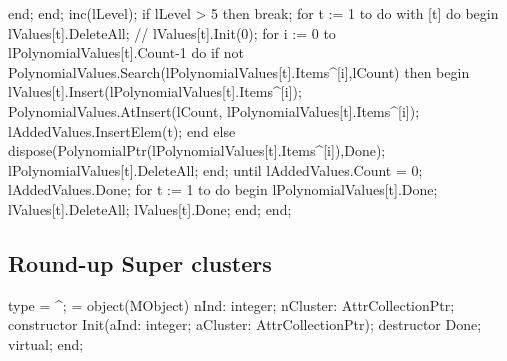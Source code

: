                   end;
      end;
      inc(lLevel);
      if lLevel > 5 then break;
      for t := 1 to  do
         with [t] do
      begin
         lValues[t].DeleteAll;
         //    lValues[t].Init(0);
         for i := 0 to lPolynomialValues[t].Count-1 do
            if not PolynomialValues.Search(lPolynomialValues[t].Items^[i],lCount) then
            begin
               lValues[t].Insert(lPolynomialValues[t].Items^[i]);
               PolynomialValues.AtInsert(lCount, lPolynomialValues[t].Items^[i]);
               lAddedValues.InsertElem(t);
            end
            else dispose(PolynomialPtr(lPolynomialValues[t].Items^[i]),Done);
         lPolynomialValues[t].DeleteAll;
      end;
   until lAddedValues.Count = 0;
   lAddedValues.Done;
   for t := 1 to  do
   begin
      lPolynomialValues[t].Done;
      lValues[t].DeleteAll;
      lValues[t].Done;
   end;
end;
\eatline
{}\nwendcode{}\nwdocspar
\subsection{Round-up Super clusters}

\nwenddocs{}\endmoddef\nwstartdeflinemarkup\nwenddeflinemarkup
type
    = ^;
    =
      object(MObject)
         nInd: integer;
         nCluster: AttrCollectionPtr;
         constructor Init(aInd: integer; aCluster: AttrCollectionPtr);
         destructor Done; virtual;
      end;
\eatline
{}\nwendcode{}\nwdocspar

